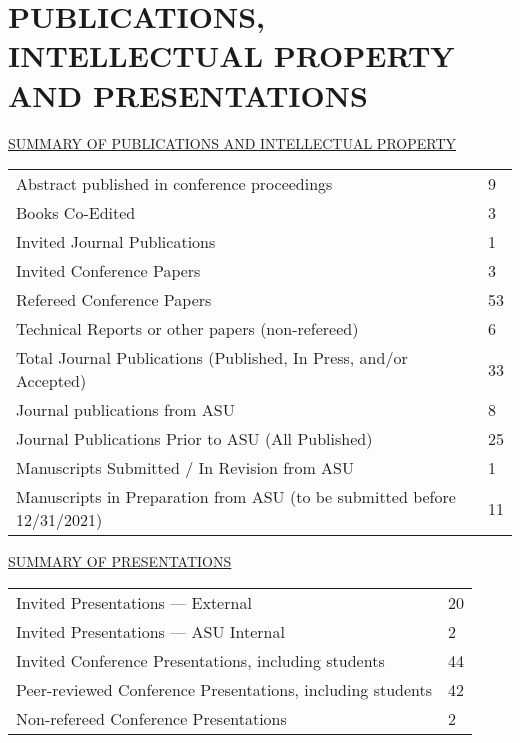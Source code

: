 \documentclass[letterpaper, 12pt]{extarticle}
\begin{document}
\part*{\uppercase{Publications, Intellectual Property and Presentations}}
\uppercase{\underline{Summary of Publications and Intellectual Property}}

\begin{tabular}{p{}p{}}
	Abstract published in conference proceedings      & 9  \\
	Books Co-Edited                                   & 3  \\
	Invited Journal Publications                      & 1  \\
	Invited Conference Papers                         & 3  \\
	Refereed Conference Papers                        & 53 \\
	Technical Reports or other papers (non-refereed)  & 6  \\
	Total Journal Publications \newline
	(Published, In Press, and/or Accepted)            & 33 \\
	Journal publications from ASU                     & 8  \\
	Journal Publications Prior to ASU (All Published) & 25 \\
	Manuscripts Submitted / In Revision from ASU      & 1  \\
	Manuscripts in Preparation from ASU \newline
	(to be submitted before 12/31/2021)               & 11 \\
\end{tabular}

\vspace{1ex}
\uppercase{\underline{Summary of Presentations}}

\begin{tabular}{p{}p{}}
	Invited Presentations --- External     & 20 \\
	Invited Presentations --- ASU Internal & 2  \\
	Invited Conference Presentations, \newline
	including students                     & 44 \\
	Peer-reviewed Conference Presentations, \newline
	including students                     & 42 \\
	Non-refereed Conference Presentations  & 2  \\
\end{tabular}
\end{document}
